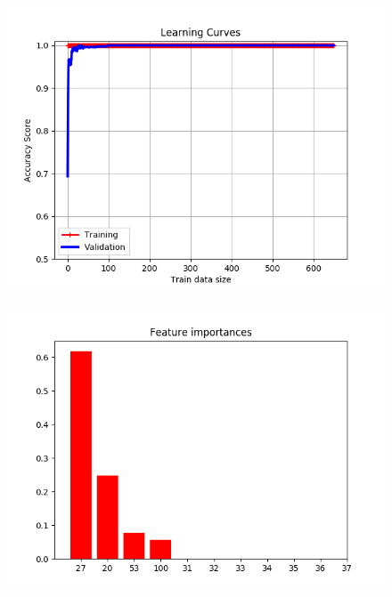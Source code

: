 \documentclass[         %
aps,                    %
prl,                    %
showpacs,               %
superscriptaddress,    %
nofootinbib,            %
twocolumn,             %
showkeys,               %
preprintnumbers,        %
floatfix               %
]{revtex4-1}               %
\begin{document}
\begin{figure}[h!]
  \centering \includegraphics[width=\linewidth]{../DT_mushroom_LearningCurve}
  \caption{\label{fig:dt_lc_mush}}
\end{figure}

\begin{figure}[h!]
  \centering \includegraphics[width=\linewidth]{../FI_mushroom.png}
  \caption{\label{fig:FI_mush}}
\end{figure}
\end{document}
